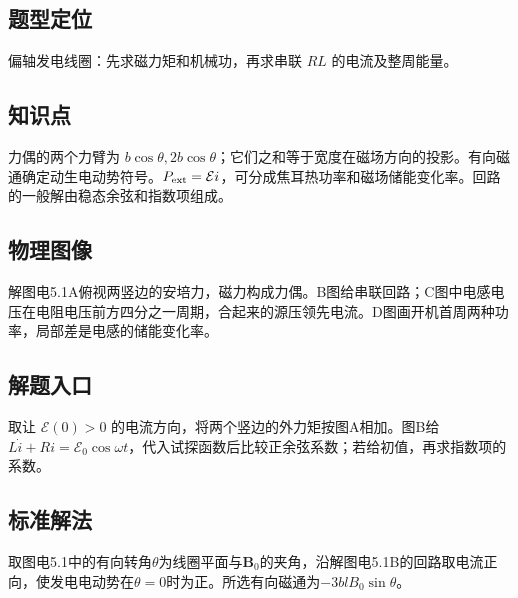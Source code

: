\documentclass[UTF8,fontset=fandol,a4paper,11pt]{ctexart}
\newcommand{\vect}[1]{\bm{#1}}
\begin{document}


\subsection*{题型定位}

偏轴发电线圈：先求磁力矩和机械功，再求串联 $RL$ 的电流及整周能量。



\subsection*{知识点}

力偶的两个力臂为 $b\cos\theta,2b\cos\theta$；它们之和等于宽度在磁场方向的投影。有向磁通确定动生电动势符号。$P_{\rm ext}=\mathcal E i$，可分成焦耳热功率和磁场储能变化率。回路的一般解由稳态余弦和指数项组成。



\subsection*{物理图像}

解图电5.1A俯视两竖边的安培力，磁力构成力偶。B图给串联回路；C图中电感电压在电阻电压前方四分之一周期，合起来的源压领先电流。D图画开机首周两种功率，局部差是电感的储能变化率。



\subsection*{解题入口}

取让 $\mathcal E(0)>0$ 的电流方向，将两个竖边的外力矩按图A相加。图B给 $L\dot i+Ri=\mathcal E_0\cos\omega t$，代入试探函数后比较正余弦系数；若给初值，再求指数项的系数。


\subsection*{标准解法}


取图电5.1中的有向转角$\theta$为线圈平面与$\vect B_0$的夹角，沿解图电5.1B的回路取电流正向，使发电电动势在$\theta=0$时为正。所选有向磁通为$-3blB_0\sin\theta$。
\end{document}
